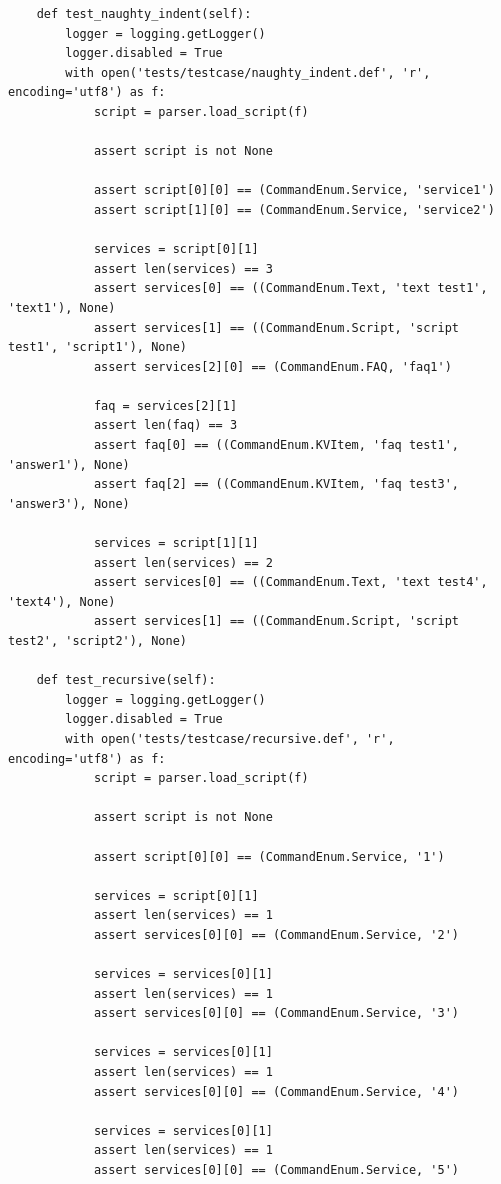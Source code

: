 \documentclass[hyperref]{ctexart}
\begin{document}
\begin{lstlisting}
    def test_naughty_indent(self):
        logger = logging.getLogger()
        logger.disabled = True
        with open('tests/testcase/naughty_indent.def', 'r', encoding='utf8') as f:
            script = parser.load_script(f)
            
            assert script is not None
            
            assert script[0][0] == (CommandEnum.Service, 'service1')
            assert script[1][0] == (CommandEnum.Service, 'service2')
            
            services = script[0][1]
            assert len(services) == 3
            assert services[0] == ((CommandEnum.Text, 'text test1', 'text1'), None)
            assert services[1] == ((CommandEnum.Script, 'script test1', 'script1'), None)
            assert services[2][0] == (CommandEnum.FAQ, 'faq1')
            
            faq = services[2][1]
            assert len(faq) == 3
            assert faq[0] == ((CommandEnum.KVItem, 'faq test1', 'answer1'), None)
            assert faq[2] == ((CommandEnum.KVItem, 'faq test3', 'answer3'), None)
            
            services = script[1][1]
            assert len(services) == 2
            assert services[0] == ((CommandEnum.Text, 'text test4', 'text4'), None)
            assert services[1] == ((CommandEnum.Script, 'script test2', 'script2'), None)

    def test_recursive(self):
        logger = logging.getLogger()
        logger.disabled = True
        with open('tests/testcase/recursive.def', 'r', encoding='utf8') as f:
            script = parser.load_script(f)
            
            assert script is not None
            
            assert script[0][0] == (CommandEnum.Service, '1')
            
            services = script[0][1]
            assert len(services) == 1
            assert services[0][0] == (CommandEnum.Service, '2')
            
            services = services[0][1]
            assert len(services) == 1
            assert services[0][0] == (CommandEnum.Service, '3')

            services = services[0][1]
            assert len(services) == 1
            assert services[0][0] == (CommandEnum.Service, '4')

            services = services[0][1]
            assert len(services) == 1
            assert services[0][0] == (CommandEnum.Service, '5')

\end{lstlisting}
\end{document}
